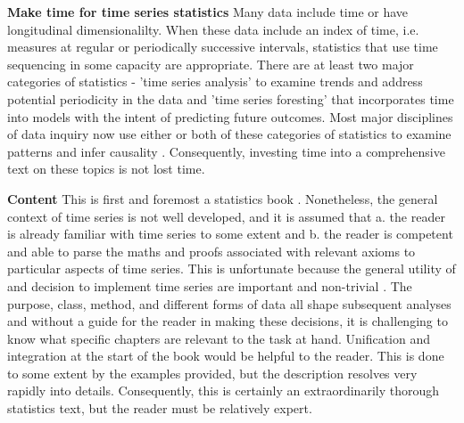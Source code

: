 \documentclass[bookreview]{jss}
\begin{document}
\textbf{Make time for time series statistics} \newline
Many data include time or have longitudinal dimensionalilty. When these data include an index of time, i.e. measures at regular or periodically successive intervals, statistics that use time sequencing in some capacity are appropriate. There are at least two major categories of statistics - 'time series analysis' to examine trends and address potential periodicity in the data and 'time series foresting' that incorporates time into models with the intent of predicting future outcomes. Most major disciplines of data inquiry now use either or both of these categories of statistics to examine patterns and infer causality \citep{Gooijer2006}. Consequently, investing time into a comprehensive text on these topics is not lost time.  \newline


\textbf{Content} \newline
This is first and foremost a statistics book \citep{Woodward2017}. Nonetheless, the general context of time series is not well developed, and it is assumed that a. the reader is already familiar with time series to some extent and b. the reader is competent and able to parse the maths and proofs associated with relevant axioms to particular aspects of time series. This is unfortunate because the general utility of and decision to implement time series are important and non-trivial \citep{Fu2011}. The purpose, class, method, and different forms of data all shape subsequent analyses and without a guide for the reader in making these decisions, it is challenging to know what specific chapters are relevant to the task at hand. Unification and integration at the start of the book would be helpful to the reader. This is done to some extent by the examples provided, but the description resolves very rapidly into details. Consequently, this is certainly an extraordinarily thorough statistics text, but the reader must be relatively expert. \newline
\end{document}

